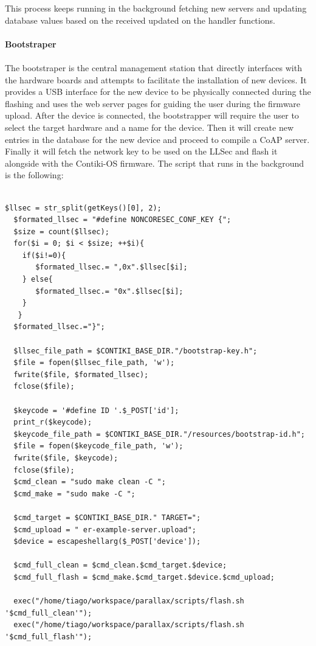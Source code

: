 This process keeps running in the background fetching new servers and updating database values based on the received updated on the handler functions.

\paragraph{\textbf{Bootstraper}}
\paragraph{}

The bootstraper is the central management station that directly interfaces with the hardware boards and attempts to facilitate the installation of new devices. It provides a USB interface for the new device to be physically connected during the flashing and uses the web server pages for guiding the user during the firmware upload. After the device is connected, the bootstrapper will require the user to select the target hardware and a name for the device. Then it will create new entries in the database for the new device and proceed to compile a \gls{CoAP} server. Finally it will fetch the network key to be used on the \gls{LLSec} and flash it alongside with the Contiki-OS firmware. The script that runs in the background is the following:

\begin{lstlisting}

$llsec = str_split(getKeys()[0], 2);
  $formated_llsec = "#define NONCORESEC_CONF_KEY {";
  $size = count($llsec);
  for($i = 0; $i < $size; ++$i){
	if($i!=0){
	   $formated_llsec.= ",0x".$llsec[$i];
	} else{
	   $formated_llsec.= "0x".$llsec[$i];
	}
   }
  $formated_llsec.="}";
  
  $llsec_file_path = $CONTIKI_BASE_DIR."/bootstrap-key.h";
  $file = fopen($llsec_file_path, 'w');
  fwrite($file, $formated_llsec);
  fclose($file);
  
  $keycode = '#define ID '.$_POST['id'];
  print_r($keycode);
  $keycode_file_path = $CONTIKI_BASE_DIR."/resources/bootstrap-id.h";
  $file = fopen($keycode_file_path, 'w');
  fwrite($file, $keycode);
  fclose($file);
  $cmd_clean = "sudo make clean -C ";
  $cmd_make = "sudo make -C ";
  
  $cmd_target = $CONTIKI_BASE_DIR." TARGET=";
  $cmd_upload = " er-example-server.upload";
  $device = escapeshellarg($_POST['device']);
  
  $cmd_full_clean = $cmd_clean.$cmd_target.$device;
  $cmd_full_flash = $cmd_make.$cmd_target.$device.$cmd_upload;
  
  exec("/home/tiago/workspace/parallax/scripts/flash.sh '$cmd_full_clean'");
  exec("/home/tiago/workspace/parallax/scripts/flash.sh '$cmd_full_flash'");
  
\end{lstlisting}

